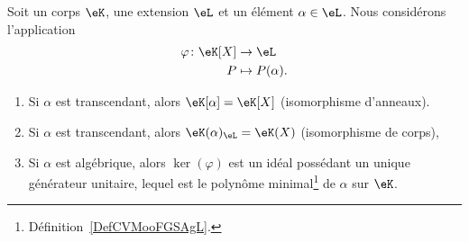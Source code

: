 \begin{proposition}     \label{PROPooSYQWooFbfQtm}
	Soit un corps \( \eK\), une extension \( \eL\) et un élément \( \alpha\in \eL\). Nous considérons l'application
	\begin{equation}
		\begin{aligned}
			\varphi\colon \eK[X] & \to \eL            \\
			P                    & \mapsto P(\alpha).
		\end{aligned}
	\end{equation}
	\begin{enumerate}
		\item       \label{ITEMooUZDQooOasiRQ}
		      Si \( \alpha\) est transcendant, alors \( \eK[\alpha]=\eK[X]\) (isomorphisme d'anneaux).
		\item
		      Si \( \alpha\) est transcendant, alors \( \eK(\alpha)_{\eL}=\eK(X)\) (isomorphisme de corps),
		\item
		      Si \( \alpha\) est algébrique, alors \( \ker(\varphi)\) est un idéal possédant un unique générateur unitaire, lequel est le polynôme minimal\footnote{Définition~\ref{DefCVMooFGSAgL}.} de \( \alpha\) sur \( \eK\).
	\end{enumerate}
\end{proposition}

